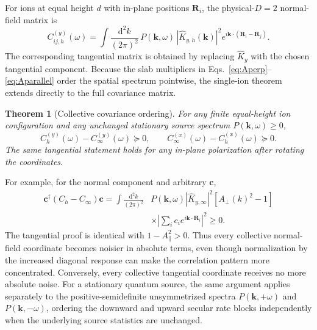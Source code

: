 \documentclass[aps,pra,twocolumn,superscriptaddress,longbibliography,nofootinbib,floatfix]{revtex4-2}
\newtheorem{theorem}{Theorem}
\theoremstyle{remark}
\newcommand{\dd}{\mathrm d}
\newcommand{\Khat}{\widehat K}
\begin{document}
For ions at equal height $d$ with in-plane positions $\bm R_i$, the physical-$D=2$ normal-field matrix is
\begin{equation}
C^{(y)}_{ij,h}(\omega)=\int\frac{\dd^2k}{(2\pi)^2}\,
P(\bm k,\omega)\,|\Khat_{y,h}(\bm k)|^2
 e^{i\bm k\cdot(\bm R_i-\bm R_j)}.
\label{eq:Cijslab}
\end{equation}
The corresponding tangential matrix is obtained by replacing $\Khat_y$ with the chosen tangential component.  Because the slab multipliers in Eqs.~\eqref{eq:Aperp}--\eqref{eq:Aparallel} order the spatial spectrum pointwise, the single-ion theorem extends directly to the full covariance matrix.

\begin{theorem}[Collective covariance ordering]
For any finite equal-height ion configuration and any unchanged stationary source spectrum $P(\bm k,\omega)\ge0$,
\begin{equation}
\boxed{C^{(y)}_h(\omega)-C^{(y)}_\infty(\omega)\succeq0,\qquad
C^{(x)}_\infty(\omega)-C^{(x)}_h(\omega)\succeq0.}
\label{eq:loewner}
\end{equation}
The same tangential statement holds for any in-plane polarization after rotating the coordinates.
\end{theorem}

For example, for the normal component and arbitrary $\bm c$,
\begin{align}
\bm c^\dagger(C_h-C_\infty)\bm c
=\int\frac{\dd^2k}{(2\pi)^2}&P(\bm k,\omega)|\Khat_{y,\infty}|^2
[A_\perp(k)^2-1]\nonumber\\
&\times\left|\sum_i c_i e^{i\bm k\cdot\bm R_i}\right|^2\ge0.
\end{align}
The tangential proof is identical with $1-A_\parallel^2>0$.  Thus every collective normal-field coordinate becomes noisier in absolute terms, even though normalization by the increased diagonal response can make the correlation pattern more concentrated.  Conversely, every collective tangential coordinate receives no more absolute noise.  For a stationary quantum source, the same argument applies separately to the positive-semidefinite unsymmetrized spectra $P(\bm k,+\omega)$ and $P(\bm k,-\omega)$, ordering the downward and upward secular rate blocks independently when the underlying source statistics are unchanged.
\end{document}
